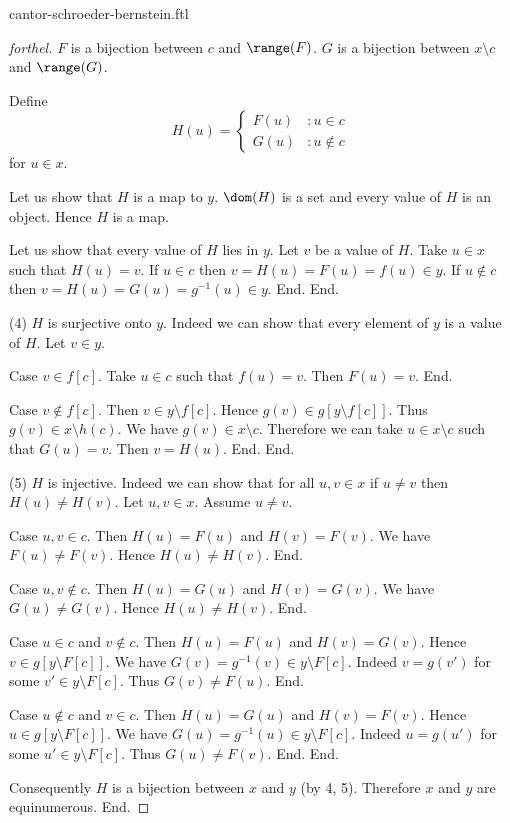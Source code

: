 \documentclass{naproche-library}
\begin{document}
\begin{smodule}[title=The Cantor-Schröder-Bernstein Theorem]{cantor-schroeder-bernstein.ftl}
\begin{proof}[forthel]
    $F$ is a bijection between $c$ and $\range(F)$.
    $G$ is a bijection between $x \setminus c$ and $\range(G)$.

    Define \[ H(u) =
      \begin{cases}
        F(u) & : u \in c \\
        G(u) & : u \notin c
      \end{cases} \]
    for $u \in x$.

    Let us show that $H$ is a map to $y$.
      $\dom(H)$ is a set and every value of $H$ is an object.
      Hence $H$ is a map.

      Let us show that every value of $H$ lies in $y$.
        Let $v$ be a value of $H$.
        Take $u \in x$ such that $H(u) = v$.
        If $u \in c$ then $v = H(u) = F(u) = f(u) \in y$.
        If $u \notin c$ then $v = H(u) = G(u) = g^{-1}(u) \in y$.
      End.
    End.

    (4) $H$ is surjective onto $y$.
    Indeed we can show that every element of $y$ is a value of $H$.
      Let $v \in y$.

      Case $v \in f[c]$.
        Take $u \in c$ such that $f(u) = v$.
        Then $F(u) = v$.
      End.

      Case $v \notin f[c]$.
        Then $v \in y \setminus f[c]$.
        Hence $g(v) \in g[y \setminus f[c]]$.
        Thus $g(v) \in x \setminus h(c)$.
        We have $g(v) \in x \setminus c$.
        Therefore we can take $u \in x \setminus c$ such that $G(u) = v$.
        Then $v = H(u)$.
      End.
    End.

    (5) $H$ is injective.
    Indeed we can show that for all $u, v \in x$ if $u \neq v$ then $H(u) \neq H(v)$.
      Let $u,v \in x$.
      Assume $u \neq v$.

      Case $u,v \in c$.
        Then $H(u) = F(u)$ and $H(v) = F(v)$.
        We have $F(u) \neq F(v)$.
        Hence $H(u) \neq H(v)$.
      End.

      Case $u,v \notin c$.
        Then $H(u) = G(u)$ and $H(v) = G(v)$.
        We have $G(u) \neq G(v)$.
        Hence $H(u) \neq H(v)$.
      End.

      Case $u \in c$ and $v \notin c$.
        Then $H(u) = F(u)$ and $H(v) = G(v)$.
        Hence $v \in g[y \setminus F[c]]$.
        We have $G(v) = g^{-1}(v) \in y \setminus F[c]$.
        Indeed $v = g(v')$ for some $v' \in y \setminus F[c]$.
        Thus $G(v) \neq F(u)$.
      End.

      Case $u \notin c$ and $v \in c$.
        Then $H(u) = G(u)$ and $H(v) = F(v)$.
        Hence $u \in g[y \setminus F[c]]$.
        We have $G(u) = g^{-1}(u) \in y \setminus F[c]$.
        Indeed $u = g(u')$ for some $u' \in y \setminus F[c]$.
        Thus $G(u) \neq F(v)$.
      End.
    End.

    Consequently $H$ is a bijection between $x$ and $y$ (by 4, 5).
    Therefore $x$ and $y$ are equinumerous.
  End.
\end{proof}
\end{smodule}
\end{document}
